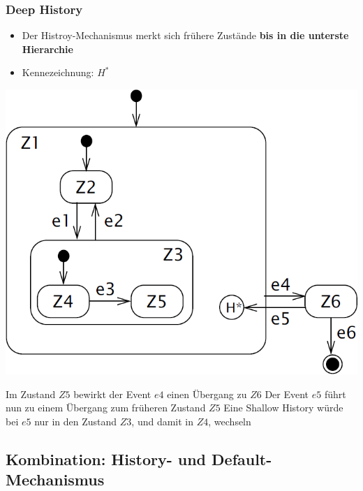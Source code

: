 \subsubsection{Deep History}

\begin{itemize}
    \item Der Histroy-Mechanismus merkt sich frühere Zustände \textbf{bis in die unterste Hierarchie}
    \item Kennezeichnung: $H^*$
\end{itemize}



\begin{minipage}[c]{0.48\columnwidth}
    \includegraphics[width=\columnwidth]{images/statechart_deep_history.png}
\end{minipage}
\hfill
\begin{minipage}[c]{0.48\columnwidth}
    \begin{outline}
        \1 Im Zustand $Z5$ bewirkt der Event $e4$ einen Übergang zu $Z6$
        \1 Der Event $e5$ führt nun zu einem Übergang zum früheren Zustand $Z5$
            \2 Eine Shallow History würde bei $e5$ nur in den Zustand $Z3$, und damit in $Z4$, wechseln
    \end{outline}
\end{minipage}


\subsection{Kombination: History- und Default-Mechanismus}

